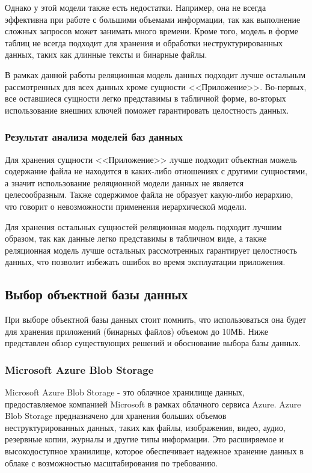 Однако у этой модели также есть недостатки. Например, она не всегда эффективна при работе с большими объемами информации, так как выполнение сложных запросов может занимать много времени. Кроме того, модель в форме таблиц не всегда подходит для хранения и обработки неструктурированных данных, таких как длинные тексты и бинарные файлы.

В рамках данной работы реляционная модель данных подходит лучше остальным рассмотренных для всех данных кроме сущности <<Приложение>>. Во-первых, все оставшиеся сущности легко представимы в табличной форме, во-вторых использование внешних ключей поможет гарантировать целостность данных.

\subsubsection{Результат анализа моделей баз данных}

Для хранения сущности <<Приложение>> лучше подходит объектная можель содержание файла не находится в каких-либо отношениях с другими сущностями, а значит использование реляционной модели данных не является целесообразным. Также содержимое файла не образует какую-либо иерархию, что говорит о невозможности применения иерархической модели.

Для хранения остальных сущностей реляционная модель подходит лучшим образом, так как данные легко представимы в табличном виде, а также реляционная модель лучше остальных рассмотренных гарантирует целостность данных, что позволит избежать ошибок во время эксплуатации приложения.

\subsection{Выбор объектной базы данных}

При выборе объектной базы данных стоит помнить, что использоваться она будет для хранения приложений (бинарных файлов) объемом до 10МБ. Ниже представлен обзор существующих решений и обоснование выбора базы данных.

\subsubsection{Microsoft Azure Blob Storage}

Microsoft Azure Blob Storage - это облачное хранилище данных, предоставляемое компанией Microsoft в рамках облачного сервиса Azure. Azure Blob Storage предназначено для хранения больших объемов неструктурированных данных, таких как файлы, изображения, видео, аудио, резервные копии, журналы и другие типы информации. Это расширяемое и высокодоступное хранилище, которое обеспечивает надежное хранение данных в облаке с возможностью масштабирования по требованию.

